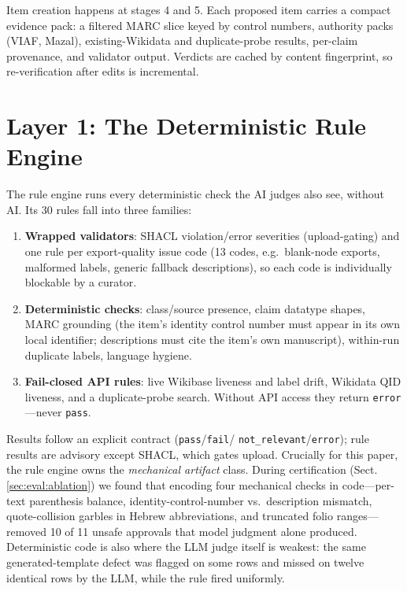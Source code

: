 \documentclass{llncs}
\begin{document}
Item creation happens at stages 4 and 5. Each proposed item carries a
compact evidence pack: a filtered MARC slice keyed by control numbers,
authority packs (VIAF, Mazal), existing-Wikidata and duplicate-probe
results, per-claim provenance, and validator output. Verdicts are cached
by content fingerprint, so re-verification after edits is incremental.

\section{Layer 1: The Deterministic Rule Engine}
\label{sec:rules}

The rule engine runs every deterministic check the AI judges also see,
without AI. Its 30 rules fall into three families:

\begin{enumerate}
\item \textbf{Wrapped validators}: SHACL violation/error severities
  (upload-gating) and one rule per export-quality issue code (13 codes,
  e.g.\ blank-node exports, malformed labels, generic fallback
  descriptions), so each code is individually blockable by a curator.
\item \textbf{Deterministic checks}: class/source presence, claim datatype
  shapes, MARC grounding (the item's identity control number must appear
  in its own local identifier; descriptions must cite the item's own
  manuscript), within-run duplicate labels, language hygiene.
\item \textbf{Fail-closed API rules}: live Wikibase liveness and label
  drift, Wikidata QID liveness, and a duplicate-probe search. Without API
  access they return \texttt{error}---never \texttt{pass}.
\end{enumerate}

Results follow an explicit contract (\texttt{pass}/\texttt{fail}/%
\texttt{not\_relevant}/\texttt{error}); rule results are advisory except
SHACL, which gates upload. Crucially for this paper, the rule engine owns
the \emph{mechanical artifact} class. During certification (Sect.~%
\ref{sec:eval:ablation}) we found that encoding four mechanical checks in
code---per-text parenthesis balance, identity-control-number vs.\
description mismatch, quote-collision garbles in Hebrew abbreviations, and
truncated folio ranges---removed 10 of 11 unsafe approvals that model
judgment alone produced. Deterministic code is also where the LLM judge
itself is weakest: the same generated-template defect was flagged on some
rows and missed on twelve identical rows by the LLM, while the rule fired
uniformly.
\end{document}
